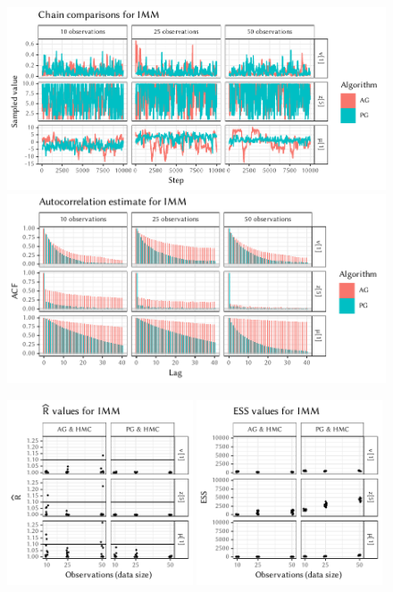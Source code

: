 \begin{figure}[p]
  \centering
  \includegraphics[width=\textwidth]{figures/IMM-chains}
  \par
  \includegraphics[width=\textwidth]{figures/IMM-acfs}
  \par
  \includegraphics[width=0.49\textwidth]{figures/IMM-rhat}
  \includegraphics[width=0.49\textwidth]{figures/IMM-ess}
  \caption{}
  \label{fig:plots-imm-right}
\end{figure}

